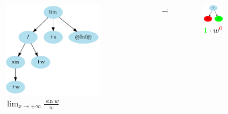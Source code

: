 \documentclass[aspectratio=149]{beamer}
\begin{document}
	\begin{frame}
		\begin{columns}
			\begin{column}{0.45\textwidth}
				\begin{figure}
					\includegraphics[width=0.8\textwidth]{pres_img/replaced2.png}
					\caption{\(\lim_{x \to +\infty}{\frac{\sin{w}}{w}}\)}
				\end{figure}
			\end{column}
			\begin{column}{0.1\textwidth}
				\begin{center}
					$\rightarrow$
				\end{center}
			\end{column}
			\begin{column}{0.45\textwidth}
				\begin{figure}
					\includegraphics[width=0.4\textwidth]{pres_img/series.png}
					\caption{\(\textcolor{green}{1} \cdot w^{\textcolor{red}{0}}\)}
				\end{figure}
			\end{column}
		\end{columns}
	\end{frame}
\end{document}
